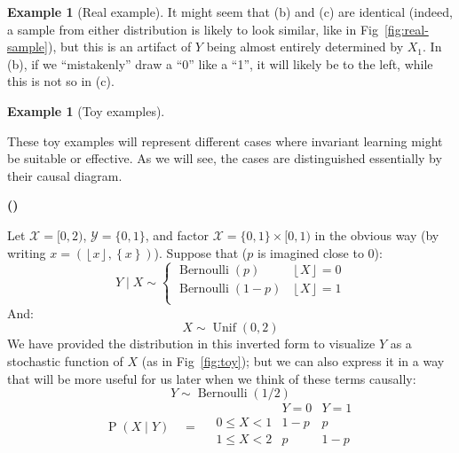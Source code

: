 \documentclass[12pt]{article}
\newcommand{\Prob}[1]{\operatorname{P}\left(#1\right)}
\newcommand{\floor}[1]{\left\lfloor #1 \right\rfloor}
\newcommand{\decimal}[1]{\left\{ #1 \right\}}
\theoremstyle{definition}
\newtheorem{exl}[thm]{Example}
\newcounter{subexl}[thm]
\newenvironment{subexl}{
    \refstepcounter{subexl}
    \bigskip
    \noindent
    \textbf{(\alph{subexl})~}%
}{}
\numberwithin{equation}{section}
\numberwithin{figure}{section}
\numberwithin{table}{section}
\begin{document}
\begin{exl}[Real example]
    It might seem that (b) and (c) are identical (indeed, a sample from either distribution is likely to look similar, like in Fig~\ref{fig:real-sample}), but this is an artifact of $Y$ being almost entirely determined by $X_1$. In (b), if we ``mistakenly'' draw a ``0'' like a ``1'', it will likely be to the left, while this is not so in (c). 
\end{exl} 

\begin{exl}[Toy examples]

\label{exl:toy}

These toy examples will represent different cases where invariant learning might be suitable or effective. As we will see, the cases are distinguished essentially by their causal diagram.

\begin{subexl}
    \label{exl:toy-a}
    Let $\mathcal{X}=[0,2)$, $\mathcal{Y}=\{0,1\}$, and factor $\mathcal{X}=\{0,1\}\times [0,1)$ in the obvious way (by writing $x=(\floor{x}, \decimal{x})$). Suppose that ($p$ is imagined close to 0): 
    \begin{equation*}
        Y\mid X\sim 
        \begin{cases}
            \operatorname{Bernoulli}(p) & \floor{X}=0 \\
            \operatorname{Bernoulli}(1-p) & \floor{X}=1 \\ 
        \end{cases}
    \end{equation*}
    And:
    \begin{equation*}
        X\sim \operatorname{Unif}(0,2)
    \end{equation*}
    We have provided the distribution in this inverted form to visualize $Y$ as a stochastic function of $X$ (as in Fig~\ref{fig:toy}); but we can also express it in a way that will be more useful for us later when we think of these terms causally:
    \begin{equation*}
        Y\sim \operatorname{Bernoulli}(1/2)
    \end{equation*}
    \begin{equation*}
        \Prob{X\mid Y} \,\,\,\,\,\, = \,\,\,\,\,\,
        \begin{array}{l|rr}
             & Y=0 & Y=1 \\
             \hline
             0 \le X < 1 & 1 - p & p \\
             1 \le X < 2 & p & 1 - p \\
        \end{array} 
    \end{equation*}
\end{subexl}


\end{exl}
\end{document}
